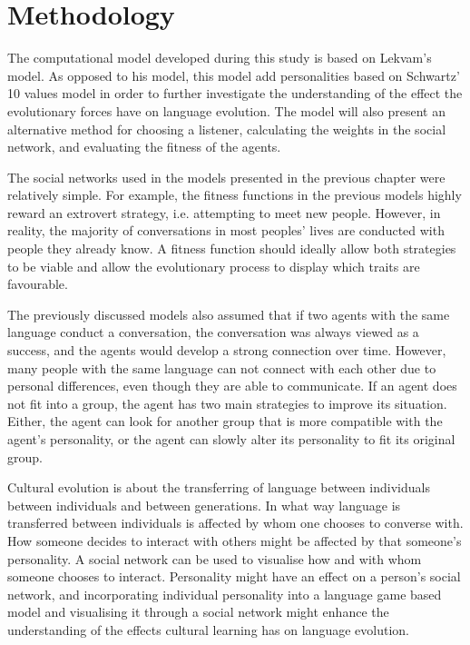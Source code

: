 \acresetall
\chapter{Methodology}\label{ch:Methodology}
The computational model developed during this study is based on Lekvam’s model. As opposed to his model, this model add personalities based on Schwartz' 10 values model \citep{lekvam2014co, schwartz2012overview} in order to further investigate the understanding of the effect the evolutionary forces have on language evolution. The model will also present an alternative method for choosing a listener, calculating the weights in the social network, and evaluating the fitness of the agents.

The social networks used in the models presented in the previous chapter were relatively simple. For example, the fitness functions in the previous models highly reward an extrovert strategy, i.e. attempting to meet new people. However, in reality, the majority of conversations in most peoples' lives are conducted with people they already know. A fitness function should ideally allow both strategies to be viable and allow the evolutionary process to display which traits are favourable.

The previously discussed models also assumed that if two agents with the same language conduct a conversation, the conversation was always viewed as a success, and the agents would develop a strong connection over time. However, many people with the same language can not connect with each other due to personal differences, even though they are able to communicate. If an agent does not fit into a group, the agent has two main strategies to improve its situation. Either, the agent can look for another group that is more compatible with the agent's personality, or the agent can slowly alter its personality to fit its original group. 

Cultural evolution is about the transferring of language between individuals between individuals and between generations. In what way language is transferred between individuals is affected by whom one chooses to converse with. How someone decides to interact with others might be affected by that someone’s personality. A social network can be used to visualise how and with whom someone chooses to interact. Personality might have an effect on a person’s social network, and incorporating individual personality into a language game based model and visualising it through a social network might enhance the understanding of the effects cultural learning has on language evolution. 

